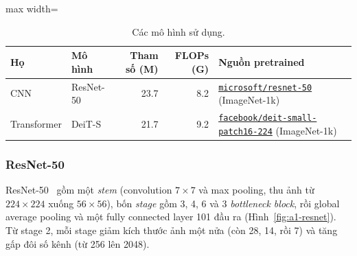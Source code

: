 \documentclass[a4paper,12pt]{article}
\begin{document}
\begin{table}[!htbp]
    \centering
    \small
    \begin{adjustbox}{max width=\linewidth}
        \begin{tabular}{llrrl}
            \toprule
            Họ          & Mô hình   & Tham số (M) & FLOPs (G) & Nguồn pretrained                                                                                                      \\
            \midrule
            CNN         & ResNet-50 & 23.7        & 8.2       & \href{https://huggingface.co/microsoft/resnet-50}{\texttt{microsoft/resnet-50}} (ImageNet-1k)                         \\
            Transformer & DeiT-S    & 21.7        & 9.2       & \href{https://huggingface.co/facebook/deit-small-patch16-224}{\texttt{facebook/deit-small-patch16-224}} (ImageNet-1k) \\
            \bottomrule
        \end{tabular}
    \end{adjustbox}
    \caption{Các mô hình sử dụng.}
    \label{tab:a1-models}
\end{table}

\FloatBarrier
\subsubsection{ResNet-50}\label{sec:a1-resnet}
ResNet-50~\cite{he2016resnet} gồm một \emph{stem} (convolution \(7\times7\) và max pooling, thu ảnh từ \(224\times224\) xuống \(56\times56\)), bốn \emph{stage} gồm 3, 4, 6 và 3 \emph{bottleneck block}, rồi global average pooling và một fully connected layer 101 đầu ra (Hình~\ref{fig:a1-resnet}). Từ stage 2, mỗi stage giảm kích thước ảnh một nửa (còn 28, 14, rồi 7) và tăng gấp đôi số kênh (từ 256 lên 2048).
\end{document}
